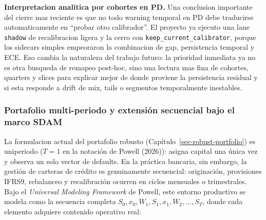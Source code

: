 \documentclass[
  spanish,
  11pt,
  letterpaper,
]{scrbook}
\theoremstyle{plain}
\theoremstyle{remark}
\begin{document}
\textbf{Interpretacion analitica por cohortes en PD.} Una conclusion
importante del cierre mas reciente es que no todo warning temporal en PD
debe traducirse automaticamente en ``probar otro calibrador''. El
proyecto ya ejecuto una lane \texttt{shadow} de recalibracion ligera y
la cerro con \texttt{keep\_current\_calibrator}, porque los sidecars
simples empeoraron la combinacion de gap, persistencia temporal y ECE.
Eso cambia la naturaleza del trabajo futuro: la prioridad inmediata ya
no es otra busqueda de remapeo post-hoc, sino una lectura mas fina de
cohortes, quarters y slices para explicar mejor de donde proviene la
persistencia residual y si esta responde a drift de mix, tails o
segmentos temporalmente inestables.

\subsubsection{Portafolio multi-periodo y extensión secuencial bajo el
marco SDAM}\label{sec-future-sdam-production}

La formulacion actual del portafolio robusto
(Capítulo~\ref{sec-robust-portfolio}) es uniperiodo (\(T = 1\) en la
notación de Powell (2026)): asigna capital una única vez y observa un
solo vector de defaults. En la práctica bancaria, sin embargo, la
gestión de carteras de crédito es genuinamente secuencial: originación,
provisiones IFRS9, rebalanceo y recalibración ocurren en ciclos
mensuales o trimestrales. Bajo el \emph{Universal Modeling Framework} de
Powell, este entorno productivo se modela como la secuencia completa
\(S_0, x_0, W_1, S_1, x_1, W_2, \dots, S_T\), donde cada elemento
adquiere contenido operativo real:
\end{document}
